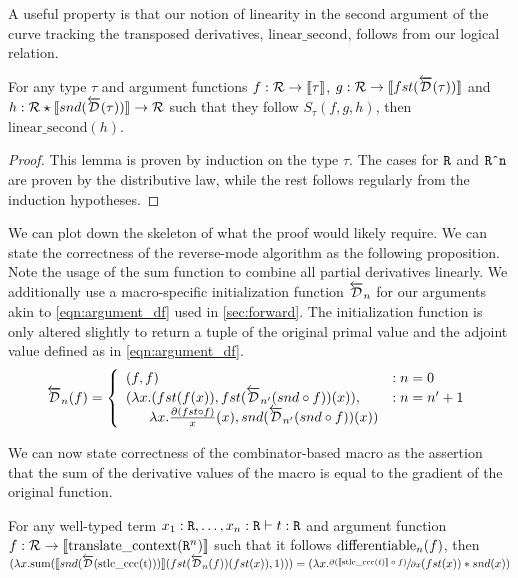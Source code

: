   A useful property is that our notion of linearity in the second argument of the curve tracking the transposed derivatives, $\text{linear\_second}$, follows from our logical relation.
  \begin{lemma}
    For any type $\tau$ and argument functions $f : \mathcal{R} \rightarrow \llbracket \tau \rrbracket$, $g : \mathcal{R} \rightarrow \llbracket fst(\overleftarrow{\mathcal{D}}(\tau))\rrbracket$ and $h : \mathcal{R} \star \llbracket snd(\overleftarrow{\mathcal{D}}(\tau)) \rrbracket \rightarrow \mathcal{R}$ such that they follow $S_\tau(f, g, h)$, then $\text{linear\_second}(h)$.
  \end{lemma}
  \begin{proof}
    This lemma is proven by induction on the type $\tau$.
    The cases for $\texttt{R}$ and $\texttt{R\^{}n}$ are proven by the distributive law, while the rest follows regularly from the induction hypotheses.
  \end{proof}

  We can plot down the skeleton of what the proof would likely require.
  We can state the correctness of the reverse-mode algorithm as the following proposition.
  Note the usage of the $\text{sum}$ function to combine all partial derivatives linearly.
  We additionally use a macro-specific initialization function $\overleftarrow{\mathcal{D}}_n$ for our arguments akin to \cref{eqn:argument_df} used in \cref{sec:forward}.
  The initialization function is only altered slightly to return a tuple of the original primal value and the adjoint value defined as in \cref{eqn:argument_df}.
  \begin{equation*}
    \overleftarrow{\mathcal{D}}_n(f) =
      \left\{
        \begin{array}{ll}
          (f, f) & : n = 0 \\
          (\lambda x. (fst(f(x)), fst(\overleftarrow{\mathcal{D}}_{n'}(snd \circ f))(x)), & : n = n' + 1 \\
          \;\;\;\;\;\; \lambda x. \frac{\partial{(fst \circ f)}}{x}(x), snd(\overleftarrow{\mathcal{D}}_{n'}(snd\circ f))(x))
        \end{array}
      \right.
  \label{eqn:argument_df_rev}
  \end{equation*}

  We can now state correctness of the combinator-based macro as the assertion that the sum of the derivative values of the macro is equal to the gradient of the original function.
  \begin{proposition}
    For any well-typed term $x_1 : \texttt{R}, \dots, x_n : \texttt{R} \vdash t : \texttt{R}$ and argument function $f :  \mathcal{R} \rightarrow \llbracket \text{translate\_context}(\texttt{R}^n) \rrbracket$ such that it follows $\text{differentiable}_{n}(f)$, then $(\lambda x. \text{sum}(\llbracket snd(\overleftarrow{\mathcal{D}}(\text{stlc\_ccc(t)}))\rrbracket (fst(\overleftarrow{\mathcal{D}}_n(f)) (fst(x)), 1))) = (\lambda x. \sfrac{\partial{(\llbracket\text{stlc\_ccc}(t)\rrbracket \circ f)}}{\partial{x}}(fst(x)) * snd(x))$
  \end{proposition}

